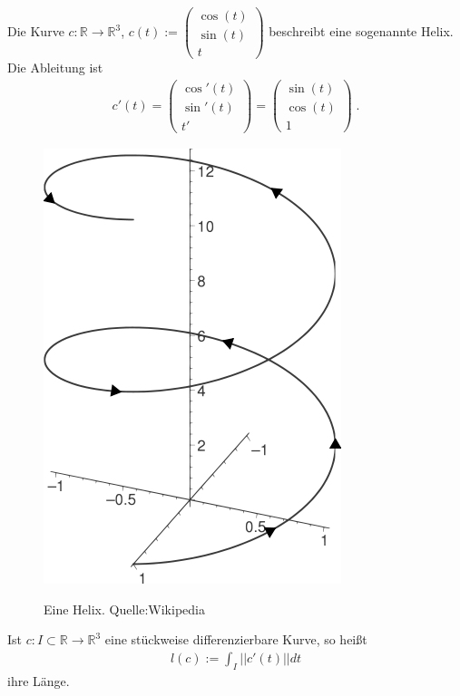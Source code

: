 \begin{Beispiel}
Die Kurve 
$c :  \mathbb{R}   \to  \mathbb{R}^3$, $c(t) :=  \begin{pmatrix} \cos(t) \\  \sin(t) \\  t \end{pmatrix}$
beschreibt eine sogenannte Helix. Die Ableitung ist
\begin{align*}
c'(t) =  \begin{pmatrix} \cos'(t) \\  \sin'(t) \\  t'  \end{pmatrix} = \begin{pmatrix} \sin(t) \\  \cos(t) \\  1 \end{pmatrix} \;.
\end{align*} 
\end{Beispiel}
\begin{figure}[H]
    \centering
    \includegraphics[scale=0.45]{images/Helix.png}
    \label{fig:helix}
    \caption{Eine Helix. Quelle:Wikipedia}
\end{figure}

\begin{Definition}
Ist $c: I \subset \mathbb{R} \to \mathbb{R}^3$ eine stückweise differenzierbare Kurve, so heißt
\begin{align*}
l(c) := \int_{I} ||c'(t)|| dt
\end{align*}
ihre Länge.
\end{Definition}


